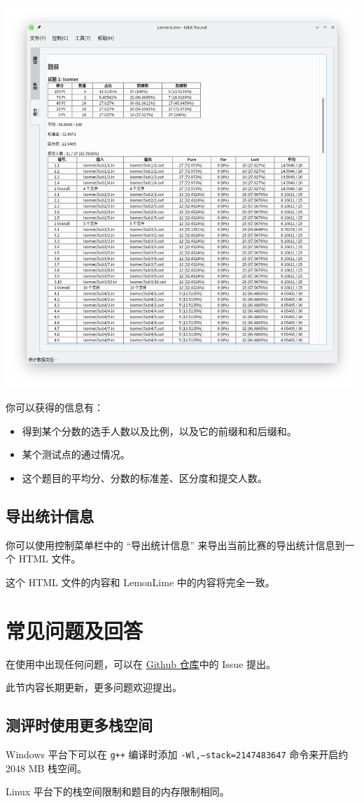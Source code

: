\documentclass[UTF-8]{ctexart}
\begin{document}
			\begin{center}
			\includegraphics[scale=0.5]{pics/statistics2.png}
			\end{center}
		
			你可以获得的信息有：
		
			\begin{itemize}
				\item 得到某个分数的选手人数以及比例，以及它的前缀和和后缀和。
				\item 某个测试点的通过情况。
				\item 这个题目的平均分、分数的标准差、区分度和提交人数。
			\end{itemize}
		
		\subsection{导出统计信息}
	
			你可以使用控制菜单栏中的 “导出统计信息” 来导出当前比赛的导出统计信息到一个 HTML 文件。
			
			这个 HTML 文件的内容和 LemonLime 中的内容将完全一致。
	
	\newpage

	\section{常见问题及回答}
	
		在使用中出现任何问题，可以在 \href{https://github.com/iotang/Project_LemonLime}{Github 仓库}中的 Issue 提出。
		
		此节内容长期更新，更多问题欢迎提出。
		
		\subsection{测评时使用更多栈空间}
		
			Windows 平台下可以在 \texttt{g++} 编译时添加 \texttt{-Wl,--stack=2147483647} 命令来开启约 2048 MB 栈空间。
			
			Linux 平台下的栈空间限制和题目的内存限制相同。
			
	\newpage
			
\end{document}
